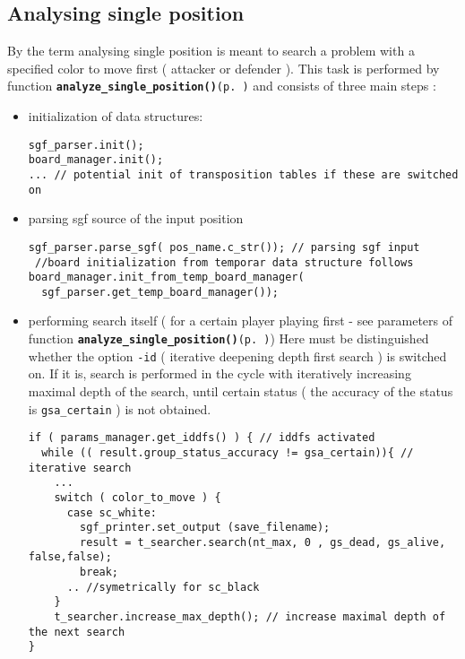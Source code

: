 \subsection{Analysing single position}\label{page_2_page_2__sec_3}
By the term analysing single position is meant to search a problem with a specified color to move first ( attacker or defender ). This task is performed by function {\tt {\bf analyze\_\-single\_\-position()}{\rm (p.\,\pageref{main_8cc_a2})}} and consists of three main steps :\begin{itemize}
\item initialization of data structures: 

\footnotesize\begin{verbatim}sgf_parser.init();
board_manager.init();
... // potential init of transposition tables if these are switched on
\end{verbatim}
\normalsize
\item parsing sgf source of the input position 

\footnotesize\begin{verbatim}sgf_parser.parse_sgf( pos_name.c_str()); // parsing sgf input 
 //board initialization from temporar data structure follows
board_manager.init_from_temp_board_manager( 
  sgf_parser.get_temp_board_manager()); 
\end{verbatim}
\normalsize
\item performing search itself ( for a certain player playing first - see parameters of function {\tt {\bf analyze\_\-single\_\-position()}{\rm (p.\,\pageref{main_8cc_a2})}}) Here must be distinguished whether the option {\tt -id} ( iterative deepening depth first search ) is switched on. If it is, search is performed in the cycle with iteratively increasing maximal depth of the search, until certain status ( the accuracy of the status is {\tt gsa\_\-certain} ) is not obtained. 

\footnotesize\begin{verbatim}if ( params_manager.get_iddfs() ) { // iddfs activated
  while (( result.group_status_accuracy != gsa_certain)){ // iterative search
    ...
    switch ( color_to_move ) {
      case sc_white: 
        sgf_printer.set_output (save_filename);
        result = t_searcher.search(nt_max, 0 , gs_dead, gs_alive, false,false);
        break;
      .. //symetrically for sc_black
    }
    t_searcher.increase_max_depth(); // increase maximal depth of the next search
}
\end{verbatim}
\normalsize
\end{itemize}


